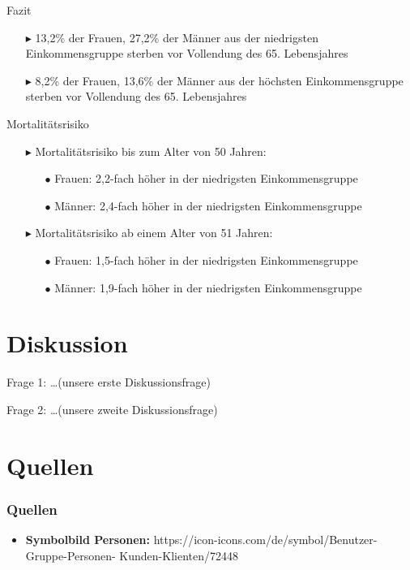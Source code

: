\documentclass{beamer}
\begin{document}
\begin{frame}{Fazit}
	\begin{block}{}
		\begin{itemize}
			\item[$\blacktriangleright$] 13,2\% der Frauen, 27,2\% der Männer aus der niedrigsten Einkommensgruppe sterben vor Vollendung des 65. Lebensjahres
			\item[$\blacktriangleright$] 8,2\% der Frauen, 13,6\% der Männer aus der höchsten Einkommensgruppe sterben vor Vollendung des 65. Lebensjahres
		\end{itemize}
	\end{block}
	\pause
	\begin{block}{Mortalitätsrisiko}
		\begin{itemize}
			\item[$\blacktriangleright$] Mortalitätsrisiko bis zum Alter von 50 Jahren:
			\begin{itemize}
				\item[$\bullet$] Frauen: 2,2-fach höher in der niedrigsten Einkommensgruppe
				\item[$\bullet$] Männer: 2,4-fach höher in der niedrigsten Einkommensgruppe
			\end{itemize}
			\item[$\blacktriangleright$] Mortalitätsrisiko ab einem Alter von 51 Jahren:
			\begin{itemize}
				\item[$\bullet$] Frauen: 1,5-fach höher in der niedrigsten Einkommensgruppe
				\item[$\bullet$] Männer: 1,9-fach höher in der niedrigsten Einkommensgruppe
			\end{itemize}
		\end{itemize}
	\end{block}
\end{frame}


\section{Diskussion}
\begin{frame}
	\begin{block}{Frage 1:}
		 \dots (unsere erste Diskussionsfrage)
	\end{block}
	\pause  %
	\begin{block}{Frage 2:}
		 \dots (unsere zweite Diskussionsfrage)
	\end{block}
\end{frame}


\section{Quellen}
\begin{frame}
\frametitle{Quellen}
  \begin{itemize}
    \item \textbf{Symbolbild Personen:}
    https://icon-icons.com/de/symbol/Benutzer-Gruppe-Personen-   Kunden-Klienten/72448
  \end{itemize}

\end{frame}
\end{document}
